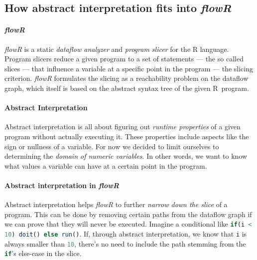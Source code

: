 \documentclass[color,coloraccent=red!60!black,listings]{poster}
\def\flowr{\textit{flowR}}
\def\rc#1{\lstinline[language=r]{#1}}
\begin{document}
\begin{multicols}{3}
	\newlength\currentparskip\setlength\currentparskip\parskip
	\begin{minipage}{\dimexpr2\columnwidth+\columnsep\relax}
		\setlength\parskip\currentparskip%
		\section*{How abstract interpretation fits into \flowr}
		\paragraph{\flowr}\flowr{} is a static \emph{dataflow analyzer} and
		\emph{program slicer} for the R language. Program slicers reduce a given program
		to a set of statements --- the so called slices --- that influence a variable at
		a specific point in the program --- the slicing criterion. \flowr{} formulates
		the slicing as a reachability problem on the dataflow graph, which itself is
		based on the abstract syntax tree of the given R~program.
		\paragraph{Abstract Interpretation} Abstract interpretation is all about
		figuring out \emph{runtime properties} of a given program without actually
		executing it. These properties include aspects like the sign or nullness of a
		variable. For now we decided to limit ourselves to determining the \emph{domain
		of numeric variables}. In other words, we want to know what values a variable
		can have at a certain point in the program.
		\paragraph{Abstract interpretation in \flowr} Abstract interpretation helps
		\flowr{} to further \emph{narrow down the slice} of a program. This can be done
		by removing certain paths from the dataflow graph if we can prove that they will
		never be executed. Imagine a conditional like \rc{if(i < 10) doit() else run()}.
		If, through abstract interpretation, we know that \rc{i} is always smaller than
		\rc{10}, there's no need to include the path stemming from the \rc{if}'s
		else-case in the slice. %

\end{minipage}
\end{multicols}
\end{document}
